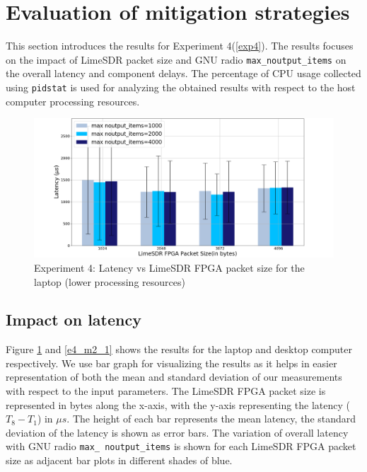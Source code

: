 \section{Evaluation of mitigation strategies}
This section introduces the results for Experiment 4(\ref{exp4}).
The results focuses on the impact of LimeSDR packet size and GNU radio \texttt{max\_noutput\_items} on the overall latency and component delays.
The percentage of CPU usage collected using \texttt{pidstat} is used for analyzing the obtained results with respect to the host computer processing resources.\\

\begin{figure}[h!]
\centering
\includegraphics[width=\textwidth]{Thesis/Figure/E4_M1_1.png}
\caption{Experiment 4: Latency vs LimeSDR FPGA packet size for the laptop (lower processing resources)}
\label{e4_m1_1}
\end{figure}

\subsection{Impact on latency}
Figure \ref{e4_m1_1} and \ref{e4_m2_1} shows the results for the laptop and desktop computer respectively.
We use bar graph for visualizing the results as it helps in easier representation of both the mean and standard deviation of our measurements with respect to the input parameters.
The LimeSDR FPGA packet size is represented in bytes along the x-axis, with the y-axis representing the latency ($T_8 - T_1$) in $\mu s$.
The height of each bar represents the mean latency, the standard deviation of the latency is shown as  error bars.
The variation of overall latency with GNU radio \texttt{max\_ noutput\_items} is shown for each LimeSDR FPGA packet size as adjacent bar plots in different shades of blue.\\

